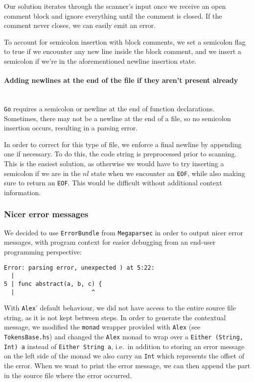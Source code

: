 \documentclass[11pt]{article}
\begin{document}
Our solution iterates through the scanner's input once we receive an
open comment block and ignore everything until the comment is closed.
If the comment never closes, we can easily emit an error.

To account for semicolon insertion with block comments, we set a
semicolon flag to true if we encounter any new line inside the block
comment, and we insert a semicolon if we're in the aforementioned
newline insertion state.
\paragraph{Adding newlines at the end of the file if they aren't
  present already}~\\
\texttt{Go} requires a semicolon or newline at the end of function
declarations. Sometimes, there may not be a newline at the end of a
file, so no semicolon insertion occurs, resulting in a parsing error.

In order to correct for this type of file, we enforce a final newline
by appending one if necessary. To do this, the code string is
preprocessed prior to scanning. This is the easiest solution, as
otherwise we would have to try inserting a semicolon if we are in the
\(nl\) state when we encounter an \texttt{EOF}, while also making sure
to return an \texttt{EOF}. This would be difficult without additional
context information.
\subsubsection{Nicer error messages}
We decided to use \texttt{ErrorBundle} from \texttt{Megaparsec}\cite{github:megaparsec} in
order to output nicer error messages, with program context for easier
debugging from an end-user programming perspective:

\begin{verbatim}
Error: parsing error, unexpected ) at 5:22:
  |
5 | func abstract(a, b, c) {
  |                      ^
\end{verbatim}

With \texttt{Alex}' default behaviour, we did not have access to the
entire source file string, as it is not kept between steps. In order
to generate the contextual message, we modified the \texttt{monad}
wrapper provided with \texttt{Alex} (see \texttt{TokensBase.hs}) and
changed the \texttt{Alex} monad to wrap over a \texttt{Either (String,
  Int) a} instead of \texttt{Either String a}, i.e.\ in addition to
storing an error message on the left side of the monad we also carry
an \texttt{Int} which represents the offset of the error. When we want
to print the error message, we can then append the part in the source
file where the error occurred.
\end{document}
